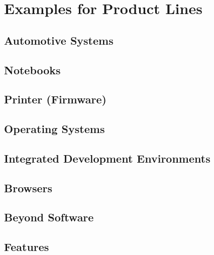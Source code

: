 

\subtitle{1. Introduction}
\author{Thomas Thüm}





\section{Examples for Product Lines}

\subsection{Automotive Systems}
\subsection{Notebooks}
\subsection{Printer (Firmware)}
\subsection{Operating Systems}
\subsection{Integrated Development Environments}
\subsection{Browsers}
\subsection{Beyond Software}



\subsection{Features}
